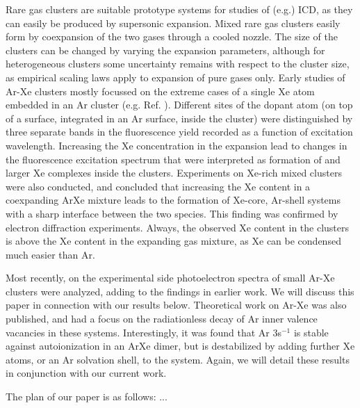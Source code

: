 \documentclass[journal=jpccck,manuscript=article,layout=twocolumn]{achemso}
\begin{document}
Rare gas clusters are suitable prototype systems for studies of (e.g.) ICD, as they can easily be produced by supersonic expansion. Mixed rare gas clusters easily form by coexpansion of the two gases through a cooled nozzle. The size of the clusters can be changed by varying the expansion parameters, although for heterogeneous clusters some uncertainty remains with respect to the cluster size, as empirical scaling laws \cite{hagena1981} apply to expansion of pure gases only. Early studies of Ar-Xe clusters mostly focussed on the extreme cases of a single Xe atom embedded in an Ar cluster (e.g. Ref. ). Different sites of the dopant atom (on top of a surface, integrated in an Ar surface, inside the cluster) were distinguished by three separate bands in the fluorescence yield recorded as a function of excitation wavelength.\cite{lengenprl} Increasing the Xe concentration in the expansion lead to changes in the fluorescence excitation spectrum that were interpreted as formation of  and larger Xe complexes inside the clusters.\cite{lengen} Experiments on Xe-rich mixed clusters were also conducted, and concluded that increasing the Xe content in a coexpanding ArXe mixture leads to the formation of Xe-core, Ar-shell systems with a sharp interface between the two species.\cite{tchaplyguine,hoener} This finding was confirmed by electron diffraction experiments.\cite{Danylchenko} Always, the observed Xe content in the clusters is above the Xe content in the expanding gas mixture, as Xe can be condensed much easier than Ar.

Most recently, on the experimental side photoelectron spectra of small Ar-Xe clusters were analyzed, adding to the findings in earlier work.\cite{Lindblad} We will discuss this paper in connection with our results below. Theoretical work on Ar-Xe was also published, and had a focus on the radiationless decay of Ar inner valence vacancies in these systems.\cite{fasshauer,fasshauer_b} Interestingly, it was found that Ar 3s$^{-1}$ is stable against autoionization in an ArXe dimer, but is destabilized by adding further Xe atoms, or an Ar solvation shell, to the system. Again, we will detail these results in conjunction with our current work.

The plan of our paper is as follows: ...


\end{document}
